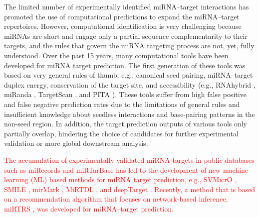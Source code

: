 \documentclass{bmcart}
\begin{document}
The limited number of experimentally identified miRNA--target interactions has promoted the use of computational predictions to expand the miRNA--target repertoires. However, computational identification is very challenging because miRNAs are short and engage only a partial sequence complementarity to their targets, and the rules that govern the miRNA targeting process are not, yet, fully understood. 
Over the past 15 years, many computational tools have been developed for miRNA target prediction. The first generation of these tools was based on very general rules of thumb, e.g., canonical seed pairing, miRNA--target duplex energy, conservation of the target site, and accessibility (e.g., RNAhybrid \cite{kruger2006rnahybrid}, miRanda \cite{enright2003microrna}, TargetScan \cite{lewis2005conserved}, and PITA \cite{kertesz2007role}). These tools suffer from high false positive and false negative prediction rates \cite{pinzon2017microrna, oliveira2017combining, fridrich2019too, min2010got} due to the limitations of general rules and insufficient knowledge about seedless interactions and base-pairing patterns in the non-seed region. In addition, the target prediction outputs of various tools only partially overlap, hindering the choice of candidates for further experimental validation or more global downstream analysis.

\textcolor{red}{The accumulation of experimentally validated miRNA targets in public databases such as miRecords \cite{xiao2009mirecords} and miRTarBase \cite{chou2016mirtarbase} has led to the development of new machine-learning (ML) based methods for miRNA target prediction, e.g., SVMicrO \cite{liu2010improving}, SMILE \cite{yu2014ensemble}, mirMark \cite{menor2014mirmark}, MiRTDL \cite{cheng2015mirtdl}, and deepTarget \cite{lee2016deeptarget}.  
Recently, a method that is based on a recommendation algorithm that focuses on network-based inference, miRTRS \cite{jiang2018mirtrs}, was developed for miRNA--target prediction. }
\end{document}
